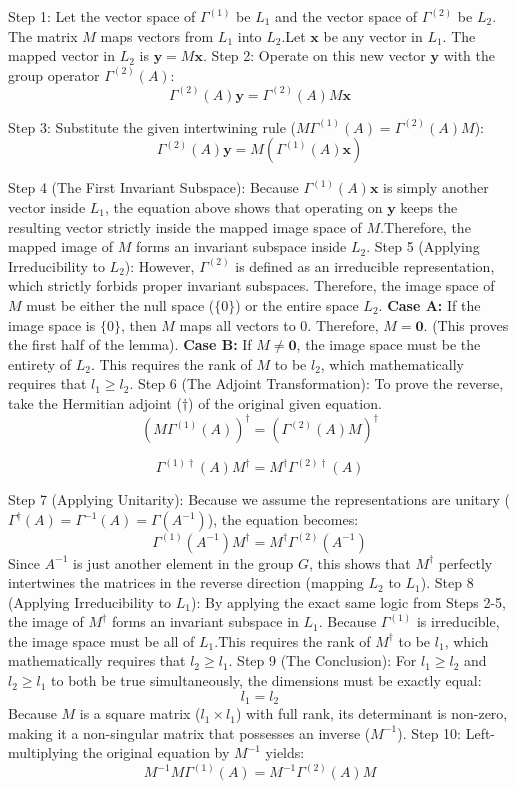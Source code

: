 \documentclass[11pt, a4paper]{report}
\begin{document}
Step 1:
 Let the vector space of $\Gamma^{(1)}$ be $L_1$ and the vector space of $\Gamma^{(2)}$ be $L_2$. The matrix $M$ maps vectors from $L_1$ into $L_2$.Let $\mathbf{x}$ be any vector in $L_1$. The mapped vector in $L_2$ is $\mathbf{y} = M\mathbf{x}$.
Step 2:
 Operate on this new vector $\mathbf{y}$ with the group operator $\Gamma^{(2)}(A)$:
\[
\Gamma^{(2)}(A)\mathbf{y} = \Gamma^{(2)}(A)M\mathbf{x}
\]

Step 3:
 Substitute the given intertwining rule ($M\Gamma^{(1)}(A) = \Gamma^{(2)}(A)M$):
\[
\Gamma^{(2)}(A)\mathbf{y} = M (\Gamma^{(1)}(A)\mathbf{x})
\]

Step 4 (The First Invariant Subspace):
 Because $\Gamma^{(1)}(A)\mathbf{x}$ is simply another vector inside $L_1$, the equation above shows that operating on $\mathbf{y}$ keeps the resulting vector strictly inside the mapped image space of $M$.Therefore, the mapped image of $M$ forms an invariant subspace inside $L_2$.
Step 5 (Applying Irreducibility to $L_2$):
However, $\Gamma^{(2)}$ is defined as an irreducible representation, which strictly forbids proper invariant subspaces. Therefore, the image space of $M$ must be either the null space ($\{0\}$) or the entire space $L_2$.
\textbf{Case A:} If the image space is $\{0\}$, then $M$ maps all vectors to $0$. Therefore, $M = \mathbf{0}$. (This proves the first half of the lemma).
\textbf{Case B:} If $M \neq \mathbf{0}$, the image space must be the entirety of $L_2$. This requires the rank of $M$ to be $l_2$, which mathematically requires that $l_1 \ge l_2$.
Step 6 (The Adjoint Transformation):
To prove the reverse, take the Hermitian adjoint ($\dagger$) of the original given equation.
\[
(M \Gamma^{(1)}(A))^\dagger = (\Gamma^{(2)}(A) M)^\dagger
\]

\[
\Gamma^{(1)\dagger}(A) M^\dagger = M^\dagger \Gamma^{(2)\dagger}(A)
\]

Step 7 (Applying Unitarity):
Because we assume the representations are unitary ($\Gamma^\dagger(A) = \Gamma^{-1}(A) = \Gamma(A^{-1})$), the equation becomes:
\[
\Gamma^{(1)}(A^{-1}) M^\dagger = M^\dagger \Gamma^{(2)}(A^{-1})
\]
Since $A^{-1}$ is just another element in the group $G$, this shows that $M^\dagger$ perfectly intertwines the matrices in the reverse direction (mapping $L_2$ to $L_1$).
Step 8 (Applying Irreducibility to $L_1$):
By applying the exact same logic from Steps 2-5, the image of $M^\dagger$ forms an invariant subspace in $L_1$. Because $\Gamma^{(1)}$ is irreducible, the image space must be all of $L_1$.This requires the rank of $M^\dagger$ to be $l_1$, which mathematically requires that $l_2 \ge l_1$.
Step 9 (The Conclusion):
For $l_1 \ge l_2$ and $l_2 \ge l_1$ to both be true simultaneously, the dimensions must be exactly equal:
\[
l_1 = l_2
\]
Because $M$ is a square matrix ($l_1 \times l_1$) with full rank, its determinant is non-zero, making it a non-singular matrix that possesses an inverse ($M^{-1}$).
Step 10:
 Left-multiplying the original equation by $M^{-1}$ yields:
\[
M^{-1} M \Gamma^{(1)}(A) = M^{-1} \Gamma^{(2)}(A) M
\]
\end{document}
